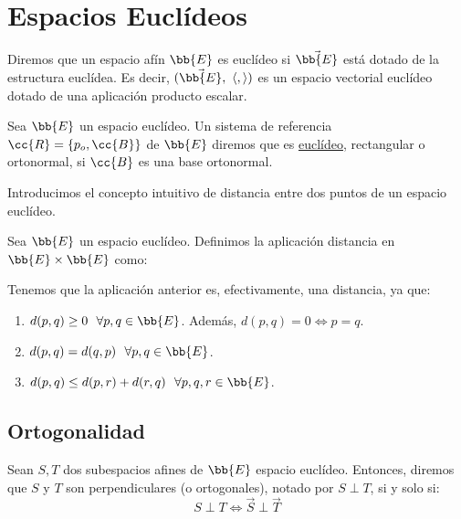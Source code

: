 \chapter{Espacios Euclídeos}\label{chap:espacios_euclideos}

\begin{definicion}
    Diremos que un espacio afín $\bb{E}$ es euclídeo si $\vec{\bb{E}}$ está dotado de la estructura euclídea.
    Es decir, $(\vec{\bb{E}},~\langle,\rangle)$ es un espacio vectorial euclídeo dotado de una aplicación producto escalar.
\end{definicion}

\begin{definicion}
    Sea $\bb{E}$ un espacio euclídeo. Un sistema de referencia $\cc{R}=\{p_o,\cc{B}\}$ de $\bb{E}$ diremos que es
    \ul{euclídeo}, rectangular o ortonormal, si $\cc{B}$ es una base ortonormal.
\end{definicion}

Introducimos el concepto intuitivo de distancia entre dos puntos de un espacio euclídeo.
\begin{definicion}[Distancia]
    Sea $\bb{E}$ un espacio euclídeo. Definimos la aplicación distancia en $\bb{E}\times \bb{E}$ como:
\end{definicion}

Tenemos que la aplicación anterior es, efectivamente, una distancia, ya que:
\begin{enumerate}
    \item $d(p,q)\geq 0~~\forall p,q\in \bb{E}$. Además, $d(p,q)=0\Longleftrightarrow p=q$.
    \item $d(p,q)=d(q,p)~~\forall p,q\in \bb{E}$.
    \item $d(p,q)\leq d(p,r) + d(r,q)~~\forall p,q,r\in \bb{E}$.
\end{enumerate}


\section{Ortogonalidad}
\begin{definicion}
    Sean $S,T$ dos subespacios afines de $\bb{E}$ espacio euclídeo. Entonces, diremos que $S$ y $T$ son perpendiculares (o ortogonales), notado por $S\perp T$, si y solo si:
    \begin{equation*}
        S\perp T \Longleftrightarrow \vec{S}\perp \vec{T}
    \end{equation*}
\end{definicion}

